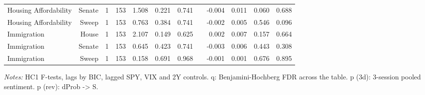 \begin{table}[htbp]
\begin{tabular}{lrrrrrrrrrrr}
Housing Affordability & Senate & 1 & 153 & 1.508 & 0.221 & 0.741 &  & -0.004 & 0.011 & 0.060 & 0.688 \\
Housing Affordability & Sweep & 1 & 153 & 0.763 & 0.384 & 0.741 &  & -0.002 & 0.005 & 0.546 & 0.096 \\
Immigration & House & 1 & 153 & 2.107 & 0.149 & 0.625 &  & 0.002 & 0.007 & 0.157 & 0.664 \\
Immigration & Senate & 1 & 153 & 0.645 & 0.423 & 0.741 &  & -0.003 & 0.006 & 0.443 & 0.308 \\
Immigration & Sweep & 1 & 153 & 0.158 & 0.691 & 0.968 &  & -0.001 & 0.001 & 0.676 & 0.895 \\
\bottomrule
\end{tabular}
\par\smallskip\footnotesize\emph{Notes:} HC1 F-tests, lags by BIC, lagged SPY, VIX and 2Y controls. q: Benjamini-Hochberg FDR across the table. p (3d): 3-session pooled sentiment. p (rev): dProb -> S.
\end{table}